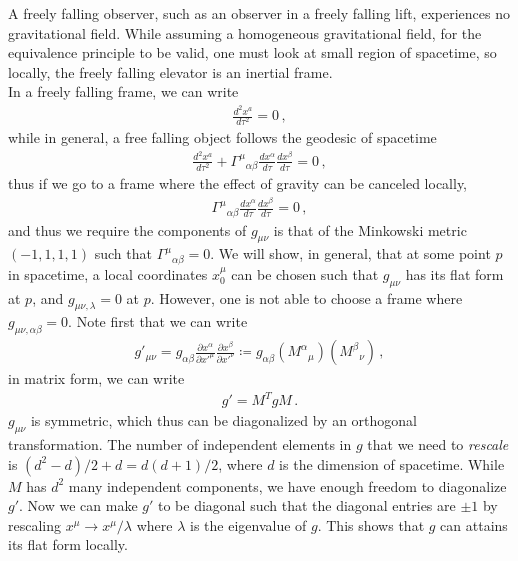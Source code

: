 \documentclass[11pt, onesided]{book}
\theoremstyle{break}
\theoremstyle{break}
\newcommand{\pd}{\partial}
\begin{document}
A freely falling observer, such as an observer in a freely falling lift, experiences no gravitational field. While assuming a homogeneous gravitational field, for the equivalence principle to be valid, one must look at small region of spacetime, so locally, the freely falling elevator is an inertial frame. \\

In a freely falling frame, we can write
\begin{align*}
\frac{d^2x^a}{d\tau^2} = 0\,,
\end{align*}
while in general, a free falling object follows the geodesic of spacetime
\begin{align*}
\frac{d^2 x^a}{d\tau^2} + \Gamma^{\mu}{}_{\alpha\beta} \frac{dx^\alpha}{d\tau}\frac{dx^\beta}{d\tau} = 0\,,
\end{align*}
thus if we go to a frame where the effect of gravity can be canceled locally,
\begin{align*}
\Gamma^{\mu}{}_{\alpha\beta} \frac{dx^\alpha}{d\tau}\frac{dx^\beta}{d\tau} = 0\,,
\end{align*}
and thus we require the components of $g_{\mu\nu}$ is that of the Minkowski metric $(-1,1,1,1)$ such that $\Gamma^\mu{}_{\alpha\beta} = 0$. We will show, in general, that at some point $p$ in spacetime, a local coordinates $x_0^\mu$ can be chosen such that $g_{\mu\nu}$ has its flat form at $p$, and $g_{\mu\nu,\lambda} = 0$ at $p$. However, one is not able to choose a frame where $g_{\mu\nu,\alpha\beta} = 0$. Note first that we can write
\begin{align*}
g'_{\mu\nu} = g_{\alpha\beta}\frac{\pd x^\alpha}{\pd x'^\mu}\frac{\pd x^\beta}{\pd x'^\nu} \coloneqq g_{\alpha\beta} (M^\alpha{}_\mu) (M^\beta{}_\nu)\,,
\end{align*}
in matrix form, we can write
\begin{align*}
g' = M^T gM\,.
\end{align*}
$g_{\mu\nu}$ is symmetric, which thus can be diagonalized by an orthogonal transformation. The number of independent elements in $g$ that we need to \textit{rescale} is $(d^2 -d)/2+d = d(d+1)/2$, where $d$ is the dimension of spacetime. While $M$ has $d^2$ many independent components, we have enough freedom to diagonalize $g'$. Now we can make $g'$ to be diagonal such that the diagonal entries are $\pm 1$ by rescaling $x^\mu \to x^\mu/\lambda$ where $\lambda$ is the eigenvalue of $g$. This shows that $g$ can attains its flat form locally.\\
\end{document}
